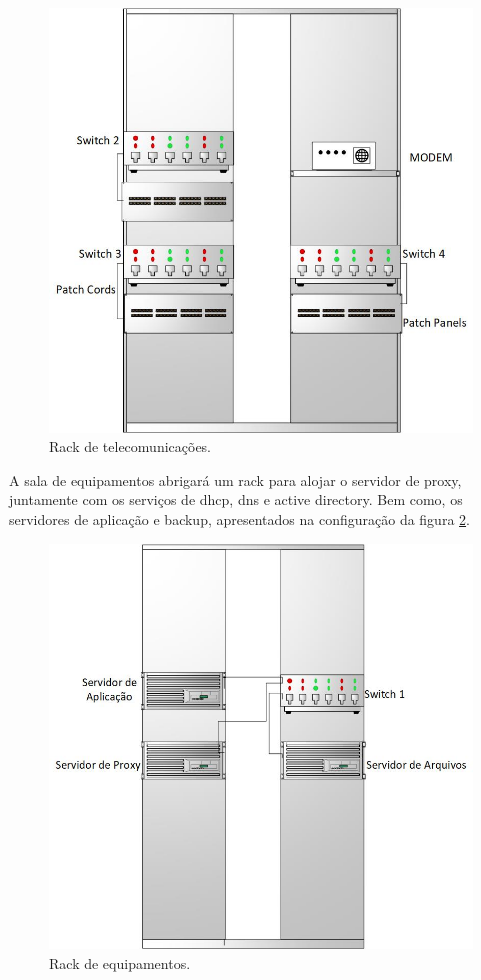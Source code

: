 \documentclass[	DIV=calc,%
							paper=a4,%
							fontsize=12pt,%
							onecolumn]{scrartcl}	 					%
\begin{document}
\begin{figure}[h]
	\centering
	\includegraphics[scale=0.5]{rack2}
	\caption{Rack de telecomunicações.}
	\label{rack2}
\end{figure}

\newpage
A sala de equipamentos abrigará um rack para alojar o servidor de proxy, juntamente com os serviços de dhcp, dns e active directory. Bem como, os servidores de aplicação e backup, apresentados na configuração da figura  \ref{rack1}.


\begin{figure}[h]
	\centering
	\includegraphics[scale=0.5]{rack1}
	\caption{Rack de equipamentos.}
	\label{rack1}
\end{figure}
\end{document}
